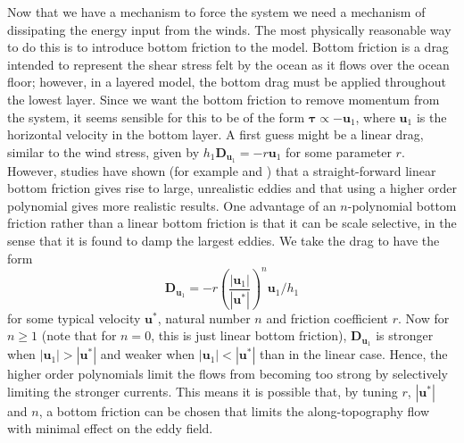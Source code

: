 \documentclass[12pt,a4paper]{report}
\begin{document}
  Now that we have a mechanism to force the system we need a 
  mechanism of dissipating the 
  energy input from the winds. The most physically reasonable way to do this is to
   introduce bottom friction to the model. Bottom friction is a drag intended to represent 
  the shear stress felt by the ocean as it flows over the ocean floor; however,
  in a layered model, the bottom drag must be applied throughout
  the lowest layer. Since we want the bottom friction to remove momentum
  from the system, it seems sensible for this to be of the form $\boldsymbol{\tau} \propto
  - \boldsymbol{u}_{1}$, where $\boldsymbol{u}_{1}$ is the horizontal velocity
  in the bottom layer. A first guess might be a linear drag, similar to the wind stress,
  given by  $h_{1}\boldsymbol{D}_{\boldsymbol{u}_{1}} = - r \boldsymbol{u}_{1}$ for
  some parameter $r$. However, studies have shown (for example \cite{grianik2004effects} and
  \cite{arbic2008quadratic})
  that a straight-forward linear
  bottom friction gives rise to large, unrealistic eddies and that using a higher order
  polynomial gives more realistic results.
  One advantage of an $n$-polynomial bottom  friction rather than 
  a linear bottom friction is that it can be scale selective, 
  in the sense that it is found to damp the largest eddies. We take the 
  drag to have the form 
  \begin{equation*}
  \boldsymbol{D}_{\boldsymbol{u}_{1}} = 
    - r \left( \frac{ \left|\boldsymbol{u}_{1}\right| }
    {\left|\boldsymbol{u}^{\ast}\right|}\right)^{n}
    \boldsymbol{u}_{1}/h_{1}
  \end{equation*} for some typical velocity $\boldsymbol{u}^{\ast}$, 
  natural number $n$ and friction coefficient $r$. Now for $n \geq 1$ (note that for $n=0$, this is 
  just linear bottom friction), $\boldsymbol{D}_{\boldsymbol{u}_{1}}$
  is stronger when $\left|\boldsymbol{u}_{1}\right| > \left|\boldsymbol{u}^{\ast}\right|$
  and weaker when $\left|\boldsymbol{u}_{1}\right| < \left|\boldsymbol{u}^{\ast}\right|$
  than in the linear case. Hence, the higher order polynomials limit the flows from 
  becoming too strong by selectively limiting the stronger currents.
  This means it is possible that, by tuning $r$, $\left|\boldsymbol{u}^{\ast}\right|$ and 
  $n$, a bottom friction can be chosen that limits the along-topography flow with
  minimal effect on the eddy field. 
  
\end{document}
